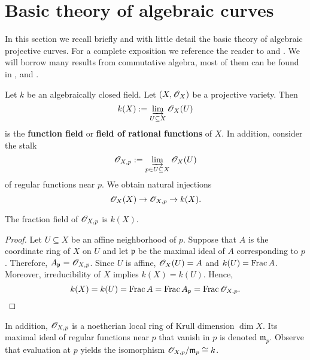 \section{Basic theory of algebraic curves}
In this section we recall briefly and with little detail the basic theory of algebraic projective curves. For a complete exposition we reference the reader to \cite{curves} and \cite{hartshorne}. We will borrow many results from commutative algebra, most of them can be found in \cite{Matsumura}, \cite{comm-alg} and \cite{atiyah}.

Let $k$ be an algebraically closed field. Let $(X, {\mathscr O}_{X})$ be a projective variety. Then 
\[
	k(X) := \varinjlim_{U\subseteq X} {\mathscr O}_{X}(U)
\]
 is the \textbf{function field} or \textbf{field of rational functions} of $X$. In addition, consider the stalk 
\[
	{\mathscr O}_{X,p} := \varinjlim_{p\in U\subseteq X} {\mathscr O}_{X}(U)
\]
of regular functions near $p$. We obtain natural injections 
\[
 	{\mathscr O}_{X}(X) \to {\mathscr O}_{X,p} \to k(X).
\] 
\begin{proposition}\label{prop:fraction-field-local-function-field}
	The fraction field of ${\mathscr O}_{X,p}$ is $k(X)$.
\end{proposition}
\begin{proof}
	Let $U \subseteq X$ be an affine neighborhood of $p$. Suppose that $A$ is the coordinate ring of $X$ on $U$ and let $\mathfrak{p}$ be the maximal ideal of $A$ corresponding to $p$. Therefore, $A_{\mathfrak{p}} = {\mathscr O}_{X,p}$. Since $U$ is affine, ${\mathscr O}_{X}(U) = A$ and $k(U) = \operatorname{Frac}{A}$. Moreover, irreducibility of $X$ implies $k(X) = k(U)$. Hence, 
	\[
		k(X) = k(U) = \operatorname{Frac}{A} = \operatorname{Frac}{A_{\mathfrak{p}}} = \operatorname{Frac}{{\mathscr O}_{X,p}}.
	\]
\end{proof}

In addition, ${\mathscr O}_{X,p}$ is a noetherian local ring of Krull dimension $\dim X$.
Its maximal ideal of regular functions near $p$ that vanish in $p$ is denoted $\mathfrak{m}_{p}$. Observe that evaluation at $p$ yields the isomorphism ${\mathscr O}_{X,p}/\mathfrak{m}_{p} \cong k$.

